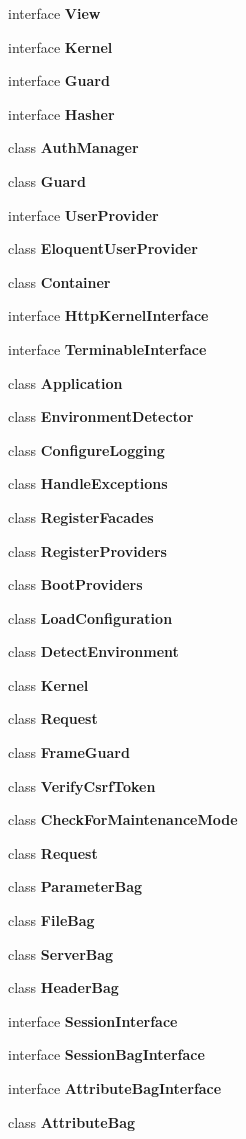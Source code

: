 \begin{DoxyCompactItemize}
\item 
interface {\bf View}
\item 
interface {\bf Kernel}
\item 
interface {\bf Guard}
\item 
interface {\bf Hasher}
\item 
class {\bf Auth\+Manager}
\item 
class {\bf Guard}
\item 
interface {\bf User\+Provider}
\item 
class {\bf Eloquent\+User\+Provider}
\item 
class {\bf Container}
\item 
interface {\bf Http\+Kernel\+Interface}
\item 
interface {\bf Terminable\+Interface}
\item 
class {\bf Application}
\item 
class {\bf Environment\+Detector}
\item 
class {\bf Configure\+Logging}
\item 
class {\bf Handle\+Exceptions}
\item 
class {\bf Register\+Facades}
\item 
class {\bf Register\+Providers}
\item 
class {\bf Boot\+Providers}
\item 
class {\bf Load\+Configuration}
\item 
class {\bf Detect\+Environment}
\item 
class {\bf Kernel}
\item 
class {\bf Request}
\item 
class {\bf Frame\+Guard}
\item 
class {\bf Verify\+Csrf\+Token}
\item 
class {\bf Check\+For\+Maintenance\+Mode}
\item 
class {\bf Request}
\item 
class {\bf Parameter\+Bag}
\item 
class {\bf File\+Bag}
\item 
class {\bf Server\+Bag}
\item 
class {\bf Header\+Bag}
\item 
interface {\bf Session\+Interface}
\item 
interface {\bf Session\+Bag\+Interface}
\item 
interface {\bf Attribute\+Bag\+Interface}
\item 
class {\bf Attribute\+Bag}
\item 

\end{DoxyCompactItemize}
